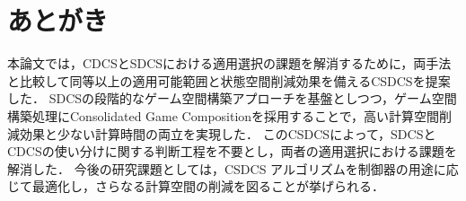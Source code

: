 \section{あとがき}
\label{section:conclusion}
本論文では，CDCSとSDCSにおける適用選択の課題を解消するために，両手法と比較して同等以上の適用可能範囲と状態空間削減効果を備えるCSDCSを提案した．
SDCSの段階的なゲーム空間構築アプローチを基盤としつつ，ゲーム空間構築処理にConsolidated Game Compositionを採用することで，高い計算空間削減効果と少ない計算時間の両立を実現した．
このCSDCSによって，SDCSとCDCSの使い分けに関する判断工程を不要とし，両者の適用選択における課題を解消した．
今後の研究課題としては，CSDCS アルゴリズムを制御器の用途に応じて最適化し，さらなる計算空間の削減を図ることが挙げられる．

